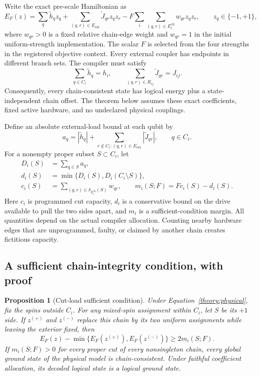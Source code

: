 \documentclass[11pt,a4paper]{article}
\newtheorem{proposition}{Proposition}[section]
\theoremstyle{definition}\newtheorem{definition}[proposition]{Definition}
\begin{document}
Write the exact pre-scale Hamiltonian as
\begin{equation}
 E_F(z)=\sum_q \widetilde h_q z_q+
 \sum_{(q,r)\in E_{\mathrm{ext}}}\widetilde J_{qr}z_qz_r
 -F\sum_i\sum_{(q,r)\in E_i^{\mathrm{ch}}}w_{qr}z_qz_r,
 \qquad z_q\in\{-1,+1\},
 \label{theory:physical}
\end{equation}
where $w_{qr}>0$ is a fixed relative chain-edge weight and $w_{qr}=1$ in the initial uniform-strength implementation. The scalar $F$ is selected from the four strengths in the registered objective context. Every external coupler has endpoints in different branch sets. The compiler must satisfy
\[
 \sum_{q\in C_i}\widetilde h_q=h_i,
 \qquad
 \sum_{(q,r)\in R_{ij}}\widetilde J_{qr}=J_{ij}.
\]
Consequently, every chain-consistent state has logical energy plus a state-independent chain offset. The theorem below assumes these exact coefficients, fixed active hardware, and no undeclared physical couplings.

Define an absolute external-load bound at each qubit by
\[
 a_q=|\widetilde h_q|+
       \sum_{r\notin C_i:(q,r)\in E_{\mathrm{ext}}}|\widetilde J_{qr}|,
 \qquad q\in C_i.
\]
For a nonempty proper subset $S\subset C_i$, let
\begin{align}
 D_i(S)&=\sum_{q\in S}a_q,\nonumber\\
 d_i(S)&=\min\{D_i(S),D_i(C_i\setminus S)\},\nonumber\\
 c_i(S)&=\sum_{(q,r)\in\delta_{E_i^{\mathrm{ch}}}(S)}w_{qr},
 \qquad
 m_i(S;F)=F c_i(S)-d_i(S).
 \label{theory:cutquantities}
\end{align}
Here $c_i$ is programmed cut capacity, $d_i$ is a conservative bound on the drive available to pull the two sides apart, and $m_i$ is a sufficient-condition margin. All quantities depend on the actual compiler allocation. Counting nearby hardware edges that are unprogrammed, faulty, or claimed by another chain creates fictitious capacity.

\subsection{A sufficient chain-integrity condition, with proof}
\label{theory:certificate}

\begin{proposition}[Cut-load sufficient condition]
\label{theory:cutproposition}
Under Equation~\eqref{theory:physical}, fix the spins outside $C_i$. For any mixed-spin assignment within $C_i$, let $S$ be its $+1$ side. If $z^{(+)}$ and $z^{(-)}$ replace this chain by its two uniform assignments while leaving the exterior fixed, then
\begin{equation}
 E_F(z)-\min\{E_F(z^{(+)}),E_F(z^{(-)})\}
 \ge 2m_i(S;F).
 \label{theory:repairgap}
\end{equation}
If $m_i(S;F)>0$ for every proper cut of every nonsingleton chain, every global ground state of the physical model is chain-consistent. Under faithful coefficient allocation, its decoded logical state is a logical ground state.
\end{proposition}
\end{document}
